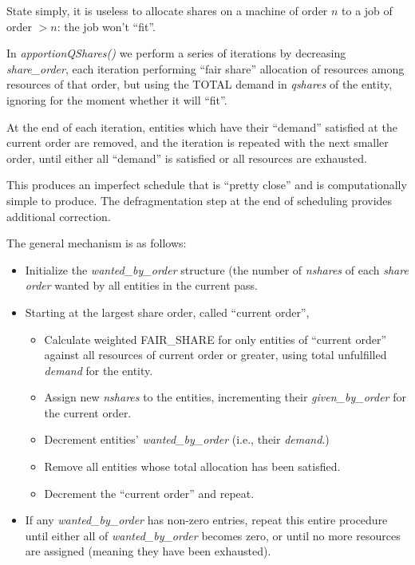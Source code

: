     State simply, it is useless to allocate shares on a machine of order $n$ to a job of order $>n$: the
    job won't ``fit''.

    In {\em apportionQShares()} we perform a series of iterations by decreasing {\em share\_order},
    each iteration performing ``fair share'' allocation of resources among resources of that order,
    but using the TOTAL demand in {\em qshares} of the entity, ignoring for the moment whether it
    will ``fit''.

    At the end of each iteration, entities which have their ``demand'' satisfied at the current
    order are removed, and the iteration is repeated with the next smaller order, until either all
    ``demand'' is satisfied or all resources are exhausted.

    This produces an imperfect schedule that is ``pretty close'' and is computationally simple to
    produce.  The defragmentation step at the end of scheduling provides additional correction.

    The general mechanism is as follows:
    \begin{itemize}
      \item Initialize the {\em wanted\_by\_order} structure (the number of {\em nshares} of each {\em share order}
        wanted by all entities in the current pass.
      \item Starting at the largest share order, called ``current order'',
        \begin{itemize}
          \item Calculate weighted FAIR\_SHARE for only entities of ``current order'' against all resources of
            current order or greater, using total unfulfilled {\em demand} for the entity.
          \item Assign new {\em nshares} to the entities, incrementing their {\em given\_by\_order} for the current order.
          \item Decrement entities' {\em wanted\_by\_order} (i.e., their {\em demand}.)
          \item Remove all entities whose total allocation has been satisfied.
          \item Decrement the ``current order'' and repeat.
        \end{itemize}
      \item If any {\em wanted\_by\_order} has non-zero entries, repeat this entire procedure until either all of {\em wanted\_by\_order}
        becomes zero, or until no more resources are assigned (meaning they have been exhausted).
      \end{itemize}

